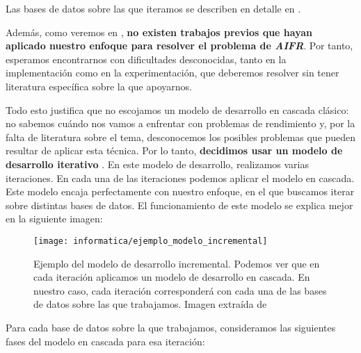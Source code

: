 Las bases de datos sobre las que iteramos se describen en detalle en .

Además, como veremos en , \textbf{no existen trabajos previos que hayan aplicado nuestro enfoque para resolver el problema de \textit{AIFR}}. Por tanto, esperamos encontrarnos con dificultades desconocidas, tanto en la implementación como en la experimentación, que deberemos resolver sin tener literatura específica sobre la que apoyarnos.

Todo esto justifica que no escojamos un modelo de desarrollo en cascada clásico: no sabemos cuándo nos vamos a enfrentar con problemas de rendimiento y, por la falta de literatura sobre el tema, desconocemos los posibles problemas que pueden resultar de aplicar esta técnica. Por lo tanto, \textbf{decidimos usar un modelo de desarrollo iterativo} \cite{informatica:libro_metodologias_desarrollo}. En este modelo de desarrollo, realizamos varias iteraciones. En cada una de las iteraciones podemos aplicar el modelo en cascada. Este modelo encaja perfectamente con nuestro enfoque, en el que buscamos iterar sobre distintas bases de datos. El funcionamiento de este modelo se explica mejor en la siguiente imagen:

\begin{figure}[H]
	\centering
	\texttt{[image: informatica/ejemplo\_modelo\_incremental]}
	\caption{Ejemplo del modelo de desarrollo incremental. Podemos ver que en cada iteración aplicamos un modelo de desarrollo en cascada. En nuestro caso, cada iteración corresponderá con cada una de las bases de datos sobre las que trabajamos. Imagen extraída de \cite{informatica:libro_metodologias_desarrollo}}
\end{figure}

Para cada base de datos sobre la que trabajamos, consideramos las siguientes fases del modelo en cascada para esa iteración:

